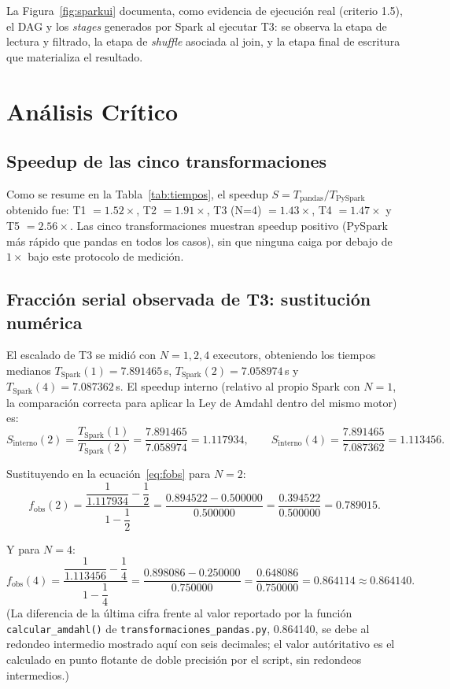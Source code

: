 \documentclass[11pt,a4paper]{article}
\begin{document}
La Figura~\ref{fig:sparkui} documenta, como evidencia de ejecuci\'on real
(criterio 1.5), el DAG y los \emph{stages} generados por Spark al ejecutar
T3: se observa la etapa de lectura y filtrado, la etapa de \emph{shuffle}
asociada al join, y la etapa final de escritura que materializa el
resultado.

\section{An\'alisis Cr\'itico}
\label{sec:analisis}

\subsection{Speedup de las cinco transformaciones}

Como se resume en la Tabla~\ref{tab:tiempos}, el speedup
$S=T_{\text{pandas}}/T_{\text{PySpark}}$ obtenido fue: T1 $=1.52\times$, T2
$=1.91\times$, T3 (N=4) $=1.43\times$, T4 $=1.47\times$ y T5 $=2.56\times$.
Las cinco transformaciones muestran speedup positivo (PySpark m\'as r\'apido
que pandas en todos los casos), sin que ninguna caiga por debajo de
$1\times$ bajo este protocolo de medici\'on.

\subsection{Fracci\'on serial observada de T3: sustituci\'on num\'erica}

El escalado de T3 se midi\'o con $N=1,2,4$ executors, obteniendo los tiempos
medianos $T_{\text{Spark}}(1)=7.891465$\,s, $T_{\text{Spark}}(2)=7.058974$\,s
y $T_{\text{Spark}}(4)=7.087362$\,s. El speedup interno (relativo al propio
Spark con $N=1$, la comparaci\'on correcta para aplicar la Ley de Amdahl
dentro del mismo motor) es:
\[
S_{\text{interno}}(2) = \frac{T_{\text{Spark}}(1)}{T_{\text{Spark}}(2)} = \frac{7.891465}{7.058974} = 1.117934,
\qquad
S_{\text{interno}}(4) = \frac{7.891465}{7.087362} = 1.113456.
\]

Sustituyendo en la ecuaci\'on~\eqref{eq:fobs} para $N=2$:
\[
f_{\text{obs}}(2) = \frac{\dfrac{1}{1.117934} - \dfrac{1}{2}}{1 - \dfrac{1}{2}}
= \frac{0.894522 - 0.500000}{0.500000}
= \frac{0.394522}{0.500000}
= 0.789015 .
\]

Y para $N=4$:
\[
f_{\text{obs}}(4) = \frac{\dfrac{1}{1.113456} - \dfrac{1}{4}}{1 - \dfrac{1}{4}}
= \frac{0.898086 - 0.250000}{0.750000}
= \frac{0.648086}{0.750000}
= 0.864114 \approx 0.864140 .
\]
(La diferencia de la \'ultima cifra frente al valor reportado por la
funci\'on \texttt{calcular\_amdahl()} de \texttt{transformaciones\_pandas.py},
0.864140, se debe al redondeo intermedio mostrado aqu\'i con seis decimales;
el valor aut\'oritativo es el calculado en punto flotante de doble
precisi\'on por el script, sin redondeos intermedios.)
\end{document}
